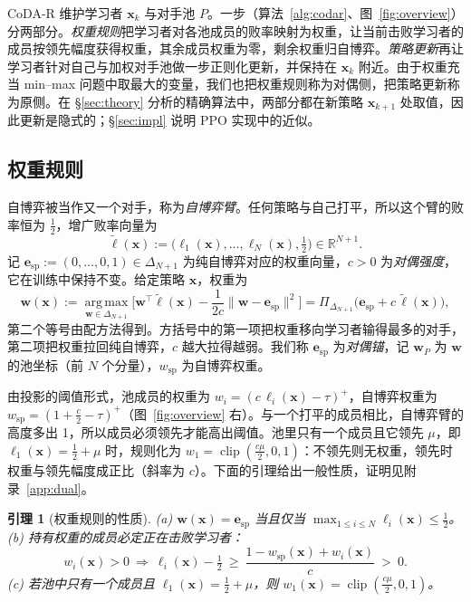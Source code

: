 \documentclass{article}
\theoremstyle{plain}
\newtheorem{lemma}[theorem]{引理}
\theoremstyle{remark}
\newcommand{\Proj}{\Pi}
\newcommand{\simplex}{\Delta}
\newcommand{\bx}{{\bm{x}}}
\newcommand{\bw}{{\bm{w}}}
\newcommand{\be}{{\bm{e}}}
\newcommand{\bell}{{\bm{\ell}}}
\newcommand{\aug}{\tilde{\bell}}
\newcommand{\esp}{\be_{\mathrm{sp}}}
\newcommand{\wsp}{w_{\mathrm{sp}}}
\newcommand{\codar}{CoDA-R}
\begin{document}
\codar{} 维护学习者 $\bx_k$ 与对手池 $P$。一步（算法~\ref{alg:codar}、图~\ref{fig:overview}）分两部分。\emph{权重规则}把学习者对各池成员的败率映射为权重，让当前击败学习者的成员按领先幅度获得权重，其余成员权重为零，剩余权重归自博弈。\emph{策略更新}再让学习者针对自己与加权对手池做一步正则化更新，并保持在 $\bx_k$ 附近。由于权重充当 min--max 问题中取最大的变量，我们也把权重规则称为对偶侧，把策略更新称为原侧。在 \S\ref{sec:theory} 分析的精确算法中，两部分都在新策略 $\bx_{k+1}$ 处取值，因此更新是隐式的；\S\ref{sec:impl} 说明 PPO 实现中的近似。

\subsection{权重规则}
\label{sec:dual}

自博弈被当作又一个对手，称为\emph{自博弈臂}。任何策略与自己打平，所以这个臂的败率恒为 $\tfrac12$，增广败率向量为
\[
\aug(\bx):=\big(\ell_1(\bx),\dots,\ell_N(\bx),\tfrac12\big)\in\mathbb R^{N+1}.
\]
记 $\esp:=(0,\dots,0,1)\in\simplex_{N+1}$ 为纯自博弈对应的权重向量，$c>0$ 为\emph{对偶强度}，它在训练中保持不变。给定策略 $\bx$，权重为
\begin{equation}
\bw(\bx):=\operatorname*{arg\,max}_{\bw\in\simplex_{N+1}}\Big[\bw^\top\aug(\bx)-\frac1{2c}\|\bw-\esp\|^2\Big]=\Proj_{\simplex_{N+1}}\big(\esp+c\,\aug(\bx)\big),
\label{eq:dual}
\end{equation}
第二个等号由配方法得到。方括号中的第一项把权重移向学习者输得最多的对手，第二项把权重拉回纯自博弈，$c$ 越大拉得越弱。我们称 $\esp$ 为\emph{对偶锚}，记 $\bw_P$ 为 $\bw$ 的池坐标（前 $N$ 个分量），$\wsp$ 为自博弈权重。

由投影的阈值形式，池成员的权重为 $w_i=(c\,\ell_i(\bx)-\tau)^+$，自博弈权重为 $\wsp=(1+\tfrac c2-\tau)^+$（图~\ref{fig:overview} 右）。与一个打平的成员相比，自博弈臂的高度多出 1，所以成员必须领先才能高出阈值。池里只有一个成员且它领先 $\mu$，即 $\ell_1(\bx)=\tfrac12+\mu$ 时，规则化为 $w_1=\operatorname{clip}(\tfrac{c\mu}2,0,1)$：不领先则无权重，领先时权重与领先幅度成正比（斜率为 $c$）。下面的引理给出一般性质，证明见附录~\ref{app:dual}。

\begin{lemma}[权重规则的性质]
\label{lem:dual}
(a) $\bw(\bx)=\esp$ 当且仅当 $\max_{1\le i\le N}\ell_i(\bx)\le\tfrac12$。\\
(b) 持有权重的成员必定正在击败学习者：
\[
w_i(\bx)>0\ \Longrightarrow\ \ell_i(\bx)-\tfrac12\ \ge\ \frac{1-\wsp(\bx)+w_i(\bx)}{c}\ >\ 0 .
\]
(c) 若池中只有一个成员且 $\ell_1(\bx)=\tfrac12+\mu$，则 $w_1(\bx)=\operatorname{clip}(\tfrac{c\mu}{2},0,1)$。
\end{lemma}
\end{document}
